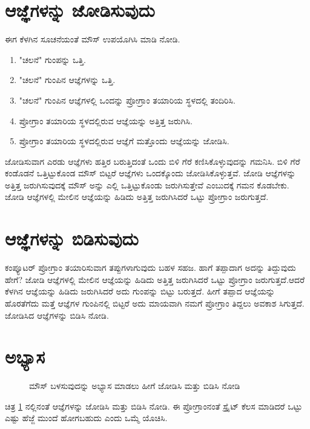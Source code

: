 \section{ಆಜ್ಞೆಗಳನ್ನು ಜೋಡಿಸುವುದು}
ಈಗ ಕೆಳಗಿನ ಸೂಚನೆಯಂತೆ ಮೌಸ್ ಉಪಯೊಗಿಸಿ ಮಾಡಿ ನೋಡಿ.  

\begin{enumerate}
\item{"ಚಲನೆ" ಗುಂಪನ್ನು ಒತ್ತಿ.}
\item{"ಚಲನೆ" ಗುಂಪಿನ ಆಜ್ಞೆಗಳನ್ನು ಒತ್ತಿ.}
\item{"ಚಲನೆ" ಗುಂಪಿನ ಆಜ್ಞೆಗಳಲ್ಲಿ ಒಂದನ್ನು ಪ್ರೋಗ್ರಾಂ ತಯಾರಿಯ ಸ್ಥಳದಲ್ಲಿ ತಂದಿರಿಸಿ.}
\item{ಪ್ರೋಗ್ರಾಂ ತಯಾರಿಯ ಸ್ಥಳದಲ್ಲಿರುವ ಆಜ್ಞೆಯನ್ನು ಅತ್ತಿತ್ತ ಜರುಗಿಸಿ.}
\item{ಪ್ರೋಗ್ರಾಂ ತಯಾರಿಯ ಸ್ಥಳದಲ್ಲಿರುವ ಆಜ್ಞೆಗೆ ಮತ್ತೊಂದು ಆಜ್ಞೆಯನ್ನು ಜೋಡಿಸಿ.}
\end{enumerate}

ಜೋಡಿಸುವಾಗ ಎರಡು ಆಜ್ಞೆಗಳು ಹತ್ತಿರ ಬರುತ್ತಿದಂತೆ ಒಂದು ಬಿಳಿ ಗೆರೆ ಕಣಿಸಿಕೊಳ್ಳುವುದನ್ನು ಗಮನಿಸಿ.  ಬಿಳಿ ಗೆರೆ ಕಂಡೊಡನೆ ಒತ್ತಿಟ್ಟುಕೊಂಡ ಮೌಸ್ ಬಿಟ್ಟರೆ ಆಜ್ಞೆಗಳು ಒಂದಕ್ಕೊಂದು ಜೋಡಿಸಿಕೊಳ್ಳುತ್ತವೆ.  ಜೋಡಿ ಆಜ್ಞೆಗಳನ್ನು ಅತ್ತಿತ್ತ ಜರುಗಿಸುವುದಕ್ಕೆ ಮೌಸ್  ಅನ್ನು ಎಲ್ಲಿ ಒತ್ತಿಟ್ಟುಕೊಂಡು ಜರುಗಿಸುತ್ತೇವೆ ಎಂಬುದಕ್ಕೆ ಗಮನ ಕೊಡಬೇಕು. ಜೋಡಿ ಆಜ್ಞೆಗಳಲ್ಲಿ ಮೇಲಿನ ಆಜ್ಞೆಯನ್ನು ಹಿಡಿದು ಅತ್ತಿತ್ತ ಜರುಗಿಸಿದರೆ ಒಟ್ಟು ಪ್ರೋಗ್ರಾಂ ಜರುಗುತ್ತದೆ.

\section{ಆಜ್ಞೆಗಳನ್ನು ಬಿಡಿಸುವುದು}
ಕಂಪ್ಯೂಟರ್ ಪ್ರೋಗ್ರಾಂ ತಯಾರಿಸುವಾಗ ತಪ್ಪುಗಳಾಗುವುದು ಬಹಳ ಸಹಜ. ಹಾಗೆ ತಪ್ಪಾದಾಗ ಅದನ್ನು ತಿದ್ದುವುದು ಹೇಗೆ? ಜೋಡಿ ಆಜ್ಞೆಗಳಲ್ಲಿ ಮೇಲಿನ ಆಜ್ಞೆಯನ್ನು ಹಿಡಿದು ಅತ್ತಿತ್ತ ಜರುಗಿಸಿದರೆ ಒಟ್ಟು ಪ್ರೋಗ್ರಾಂ ಜರುಗುತ್ತದೆ.ಆದರೆ ಕೆಳಗಿನ ಆಜ್ಞೆಯನ್ನು ಹಿಡಿದು ಜರುಗಿಸಿದರೆ ಅದು ಗುಂಪನ್ನು ಬಿಟ್ಟು ಬರುತ್ತದೆ. ಹೀಗೆ ತಪ್ಪಾದ ಆಜ್ಞೆಯನ್ನು ಹೊರತೆಗೆದು ಮತ್ತೆ ಆಜ್ಞೆಗಳ ಗುಂಪಿನಲ್ಲಿ ಬಿಟ್ಟರೆ ಅದು ಮಾಯವಾಗಿ ನಮಗೆ ಪ್ರೋಗ್ರಾಂ ತಿದ್ದಲು ಅವಕಾಶ ಸಿಗುತ್ತದೆ.  ಜೋಡಿಸಿದ  ಆಜ್ಞೆಗಳನ್ನು ಬಿಡಿಸಿ ನೋಡಿ.

\section{ಅಭ್ಯಾಸ}
\begin{figure}[h]
\begin{Scratch}[1]
\end{Scratch}
\caption{ಮೌಸ್ ಬಳಸುವುದನ್ನು ಅಭ್ಯಾಸ ಮಾಡಲು ಹೀಗೆ ಜೋಡಿಸಿ ಮತ್ತು ಬಿಡಿಸಿ ನೋಡಿ}
\label{mouse}
\end{figure}

ಚಿತ್ರ \ref{mouse} ನಲ್ಲಿನಂತೆ ಆಜ್ಞೆಗಳನ್ನು ಜೋಡಿಸಿ ಮತ್ತು ಬಿಡಿಸಿ ನೋಡಿ.  ಈ ಪ್ರೋಗ್ರಾಂನಂತೆ ಸ್ಪ್ರೈಟ್ ಕೆಲಸ ಮಾಡಿದರೆ ಒಟ್ಟು ಎಷ್ಟು ಹೆಜ್ಜೆ ಮುಂದೆ ಹೋಗಬಹುದು ಎಂದು ಒಮ್ಮೆ ಯೊಚಿಸಿ.